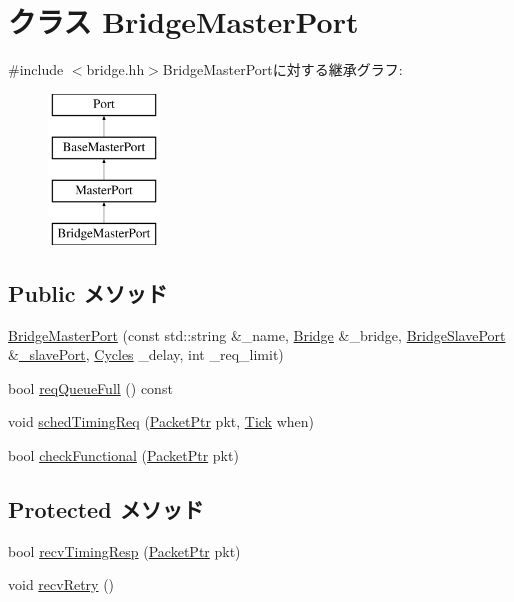 \hypertarget{classBridge_1_1BridgeMasterPort}{
\section{クラス BridgeMasterPort}
\label{classBridge_1_1BridgeMasterPort}
}


{\ttfamily \#include $<$bridge.hh$>$}BridgeMasterPortに対する継承グラフ:\begin{figure}[H]
\begin{center}
\leavevmode
\includegraphics[height=4cm]{classBridge_1_1BridgeMasterPort}
\end{center}
\end{figure}
\subsection*{Public メソッド}
\begin{DoxyCompactItemize}
\item 
\hyperlink{classBridge_1_1BridgeMasterPort_a0e907bb2314fb9bd4dcc0a702c1948dd}{BridgeMasterPort} (const std::string \&\_\-name, \hyperlink{classBridge_1_1Bridge}{Bridge} \&\_\-bridge, \hyperlink{classBridge_1_1BridgeSlavePort}{BridgeSlavePort} \&\hyperlink{classMasterPort_a33e3b01a66e2118c0e01887bd905e904}{\_\-slavePort}, \hyperlink{classCycles}{Cycles} \_\-delay, int \_\-req\_\-limit)
\item 
bool \hyperlink{classBridge_1_1BridgeMasterPort_a5b40b3c494ce10f0e9f0c89965808030}{reqQueueFull} () const 
\item 
void \hyperlink{classBridge_1_1BridgeMasterPort_a6e835b0c02fcb4679fc14de7605b4f13}{schedTimingReq} (\hyperlink{classPacket}{PacketPtr} pkt, \hyperlink{base_2types_8hh_a5c8ed81b7d238c9083e1037ba6d61643}{Tick} when)
\item 
bool \hyperlink{classBridge_1_1BridgeMasterPort_a8eb60d4744b6212ad749f3a586759266}{checkFunctional} (\hyperlink{classPacket}{PacketPtr} pkt)
\end{DoxyCompactItemize}
\subsection*{Protected メソッド}
\begin{DoxyCompactItemize}
\item 
bool \hyperlink{classBridge_1_1BridgeMasterPort_a482dba5588f4bee43e498875a61e5e0b}{recvTimingResp} (\hyperlink{classPacket}{PacketPtr} pkt)
\item 
void \hyperlink{classBridge_1_1BridgeMasterPort_a29cb5a4f98063ce6e9210eacbdb35298}{recvRetry} ()
\end{DoxyCompactItemize}
